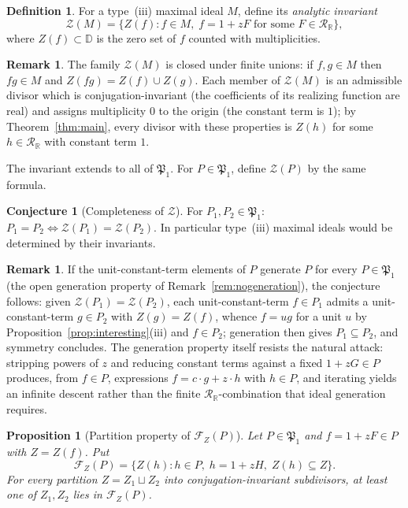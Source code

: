 \documentclass[12pt]{amsart}
\newtheorem{proposition}[theorem]{Proposition}
\theoremstyle{definition}
\newtheorem{definition}[theorem]{Definition}
\newtheorem{remark}[theorem]{Remark}
\newtheorem{conjecture}[theorem]{Conjecture}
\newcommand{\D}{\mathbb{D}}
\newcommand{\mRR}{\mathcal{R}_{\mathbb{R}}}
\begin{document}
\begin{definition}
For a type~(iii) maximal ideal $M$, define its \emph{analytic invariant}
\[
  \mathcal{Z}(M) = \{ Z(f) : f \in M,\; f = 1 + zF \text{ for some }
  F \in \mRR \},
\]
where $Z(f) \subset \D$ is the zero set of $f$ counted with
multiplicities.
\end{definition}

\begin{remark}
\label{rem:Zunion}
The family $\mathcal{Z}(M)$ is closed under finite unions: if $f, g \in
M$ then $fg \in M$ and $Z(fg) = Z(f) \cup Z(g)$.  Each member of
$\mathcal{Z}(M)$ is an admissible divisor which is conjugation-invariant
(the coefficients of its realizing function are real) and assigns
multiplicity $0$ to the origin (the constant term is $1$); by
Theorem~\ref{thm:main}, every divisor with these properties is $Z(h)$
for some $h \in \mRR$ with constant term $1$.
\end{remark}

The invariant extends to all of $\mathfrak{P}_1$.  For $P \in
\mathfrak{P}_1$, define $\mathcal{Z}(P)$ by the same formula.

\begin{conjecture}[Completeness of $\mathcal{Z}$]
\label{prop:prime1invariant}
For $P_1, P_2 \in \mathfrak{P}_1$: $P_1 = P_2 \iff \mathcal{Z}(P_1) =
\mathcal{Z}(P_2)$.  In particular type~(iii) maximal ideals would be
determined by their invariants.
\end{conjecture}

\begin{remark}
If the unit-constant-term elements of $P$ generate $P$ for every $P \in
\mathfrak{P}_1$ (the open generation property of
Remark~\ref{rem:nogeneration}), the conjecture follows: given
$\mathcal{Z}(P_1) = \mathcal{Z}(P_2)$, each unit-constant-term $f \in
P_1$ admits a unit-constant-term $g \in P_2$ with $Z(g) = Z(f)$, whence
$f = ug$ for a unit $u$ by Proposition~\ref{prop:interesting}(iii) and
$f \in P_2$; generation then gives $P_1 \subseteq P_2$, and symmetry
concludes.  The generation property itself resists the natural attack:
stripping powers of $z$ and reducing constant terms against a fixed $1 +
zG \in P$ produces, from $f \in P$, expressions $f = c \cdot g + z
\cdot h$ with $h \in P$, and iterating yields an infinite descent rather
than the finite $\mRR$-combination that ideal generation requires.
\end{remark}

\begin{proposition}[Partition property of $\mathcal{F}_Z(P)$]
\label{prop:prime1ultrafilter}
Let $P \in \mathfrak{P}_1$ and $f = 1 + zF \in P$ with $Z = Z(f)$.  Put
\[
  \mathcal{F}_Z(P) = \{ Z(h) : h \in P,\; h = 1 + zH,\; Z(h) \subseteq Z \}.
\]
For every partition $Z = Z_1 \sqcup Z_2$ into conjugation-invariant
subdivisors, at least one of $Z_1, Z_2$ lies in $\mathcal{F}_Z(P)$.
\end{proposition}
\end{document}
